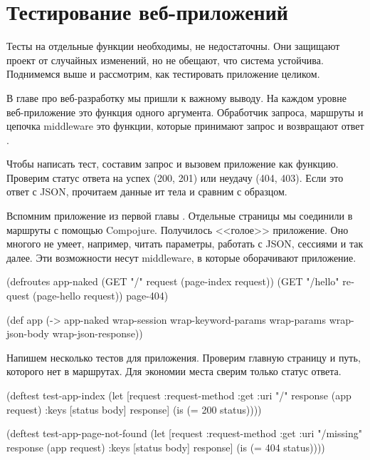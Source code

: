 \section{Тестирование веб-приложений}


Тесты на отдельные функции необходимы, не недостаточны. Они защищают проект от
случайных изменений, но не обещают, что система устойчива. Поднимемся выше и
рассмотрим, как тестировать приложение целиком.

В главе про веб-разработку мы пришли к важному выводу. На каждом уровне
веб-приложение это функция одного аргумента. Обработчик запроса, маршруты и
цепочка middleware это функции, которые принимают запрос и возвращают
ответ .

Чтобы написать тест, составим запрос и вызовем приложение как функцию. Проверим
статус ответа на успех (200, 201) или неудачу (404, 403). Если это ответ с JSON,
прочитаем данные ит тела и сравним с образцом.

Вспомним приложение из первой главы . Отдельные страницы мы
соединили в маршруты с помощью Compojure. Получилось <<голое>> приложение. Оно
многого не умеет, например, читать параметры, работать с JSON, сессиями и так
далее. Эти возможности несут middleware, в которые оборачивают приложение.


\begin{english}
  \begin{clojure}
(defroutes app-naked
  (GET "/"      request (page-index request))
  (GET "/hello" request (page-hello request))
  page-404)

(def app
  (-> app-naked
      wrap-session
      wrap-keyword-params
      wrap-params
      wrap-json-body
      wrap-json-response))
  \end{clojure}
\end{english}

Напишем несколько тестов для приложения. Проверим главную страницу и путь,
которого нет в маршрутах. Для экономии места сверим только статус ответа.

\begin{english}
  \begin{clojure}
(deftest test-app-index
  (let [request {:request-method :get :uri "/"}
        response (app request)
        {:keys [status body]} response]
    (is (= 200 status))))

(deftest test-app-page-not-found
  (let [request {:request-method :get :uri "/missing"}
        response (app request)
        {:keys [status body]} response]
    (is (= 404 status))))
  \end{clojure}
\end{english}

